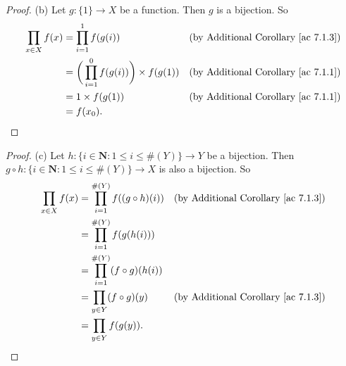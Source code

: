 \begin{proof}{(b)}
    Let \(g : \{1\} \to X\) be a function.
    Then \(g\) is a bijection.
    So
    \begin{align*}
        \prod_{x \in X} f(x) & = \prod_{i = 1}^1 f(g(i))                            & \text{(by Additional Corollary \ref{ac 7.1.3})} \\
                             & = \bigg(\prod_{i = 1}^0 f(g(i))\bigg) \times f(g(1)) & \text{(by Additional Corollary \ref{ac 7.1.1})} \\
                             & = 1 \times f(g(1))                                   & \text{(by Additional Corollary \ref{ac 7.1.1})} \\
                             & = f(x_0).
    \end{align*}
\end{proof}

\begin{proof}{(c)}
    Let \(h : \{i \in \mathbf{N} : 1 \leq i \leq \#(Y)\} \to Y\) be a bijection.
    Then \(g \circ h : \{i \in \mathbf{N} : 1 \leq i \leq \#(Y)\} \to X\) is also a bijection.
    So
    \begin{align*}
        \prod_{x \in X} f(x) & = \prod_{i = 1}^{\#(Y)} f((g \circ h)(i)) & \text{(by Additional Corollary \ref{ac 7.1.3})} \\
                             & = \prod_{i = 1}^{\#(Y)} f(g(h(i)))                                                          \\
                             & = \prod_{i = 1}^{\#(Y)} (f \circ g)(h(i))                                                   \\
                             & = \prod_{y \in Y} (f \circ g)(y)          & \text{(by Additional Corollary \ref{ac 7.1.3})} \\
                             & = \prod_{y \in Y} f(g(y)).
    \end{align*}
\end{proof}


